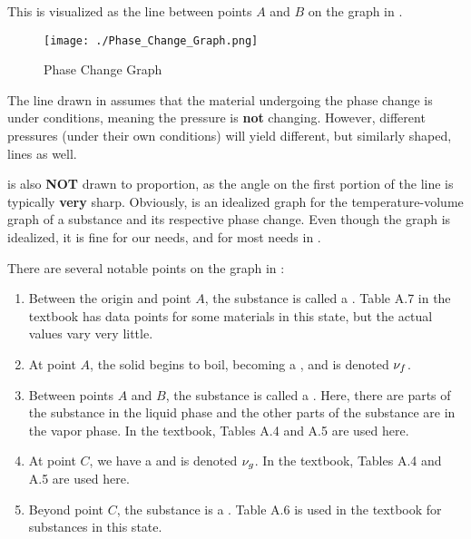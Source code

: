 This is visualized as the line between points $A$ and $B$ on the graph in .

\begin{figure}[h!tbp]
  \centering
  \texttt{[image: ./Phase\_Change\_Graph.png]}
  \caption{Phase Change Graph}
  \label{fig:Phase_Change}
\end{figure}

The line drawn in  assumes that the material undergoing the phase change is under  conditions, meaning the pressure is \textbf{not} changing.
However, different pressures (under their own  conditions) will yield different, but similarly shaped, lines as well.

\begin{remark*}
   is also \textbf{NOT} drawn to proportion, as the angle on the first portion of the line is typically \textbf{very} sharp.
  Obviously,  is an idealized graph for the temperature-volume graph of a substance and its respective phase change.
  Even though the graph is idealized, it is fine for our needs, and for most needs in .
\end{remark*}

There are several notable points on the graph in :
\begin{enumerate}[noitemsep]
\item Between the origin and point $A$, the substance is called a .
  Table A.7 in the textbook has data points for some materials in this state, but the actual values vary very little.
\item At point $A$, the solid begins to boil, becoming a , and is denoted $\nu_{f}$.
\item Between points $A$ and $B$, the substance is called a .
  Here, there are parts of the substance in the liquid phase and the other parts of the substance are in the vapor phase.
  In the textbook, Tables A.4 and A.5 are used here.
\item At point $C$, we have a  and is denoted $\nu_{g}$.
  In the textbook, Tables A.4 and A.5 are used here.
\item Beyond point $C$, the substance is a .
  Table A.6 is used in the textbook for substances in this state.
\end{enumerate}

